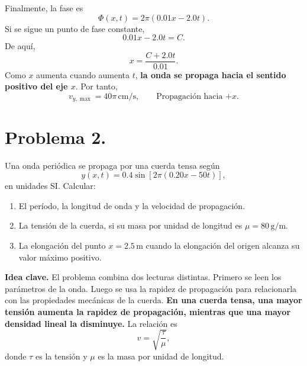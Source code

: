 \documentclass[11pt]{article}
\newcommand{\ideaclave}[1]{%
  \par\medskip
  \noindent\textbf{Idea clave.} #1\par
}
\begin{document}
Finalmente, la fase es
\begin{equation*}
    \Phi(x,t)=2\pi(0.01x-2.0t).
\end{equation*}
Si se sigue un punto de fase constante,
\begin{equation*}
    0.01x-2.0t=C.
\end{equation*}
De aqu\'i,
\begin{equation*}
    x=\frac{C+2.0t}{0.01}.
\end{equation*}
Como $x$ aumenta cuando aumenta $t$, \textbf{la onda se propaga hacia el sentido positivo del eje $x$}. Por tanto,
\begin{equation*}
    \boxed{v_{y,\max}=40\pi\,\mathrm{cm/s}},
    \qquad
    \boxed{\text{Propagaci\'on hacia }{+x}}.
\end{equation*}

\clearpage

\section*{Problema 2.}
Una onda peri\'odica se propaga por una cuerda tensa seg\'un
\begin{equation*}
    y(x,t)=0.4\sin\left[2\pi(0.20x-50t)\right],
\end{equation*}
en unidades SI. Calcular:
\begin{enumerate}[label=(\alph*)]
    \item El per\'iodo, la longitud de onda y la velocidad de propagaci\'on.
    \item La tensi\'on de la cuerda, si su masa por unidad de longitud es $\mu=80\,\mathrm{g/m}$.
    \item La elongaci\'on del punto $x=2.5\,\mathrm{m}$ cuando la elongaci\'on del origen alcanza su valor m\'aximo positivo.
\end{enumerate}

\ideaclave{El problema combina dos lecturas distintas. Primero se leen los par\'ametros de la onda. Luego se usa la rapidez de propagaci\'on para relacionarla con las propiedades mec\'anicas de la cuerda.
\textbf{En una cuerda tensa, una mayor tensi\'on aumenta la rapidez de propagaci\'on, mientras que una mayor densidad lineal la disminuye.} La relaci\'on es
\begin{equation*}
    v=\sqrt{\frac{\tau}{\mu}},
\end{equation*}
donde $\tau$ es la tensi\'on y $\mu$ es la masa por unidad de longitud.}
\end{document}
